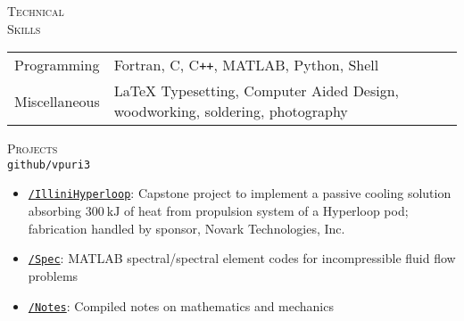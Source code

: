 \documentclass[10pt]{article}
\begin{document}
\vspace{-1.5em}
\begin{multicols}{2}
\textsc{\small Technical \\ Skills}
\columnbreak

\begin {table}[H]
\begin{tabular}{l l }
\hspace{-0.5em}Programming   & \hspace{-0.0em}Fortran, C, C\texttt{++}, MATLAB, Python, Shell\\
\hspace{-0.5em}Miscellaneous & \hspace{-0.0em}\LaTeX{} Typesetting, Computer Aided Design, woodworking, soldering, photography \\
\end{tabular}	
\end{table}

\vspace{-1.0em}
\end{multicols}
\vspace{-1.5em}
\begin{multicols}{2}
\textsc{\small Projects}\\ \texttt{github/vpuri3}
\columnbreak

\vspace{-2.0em}
\begin{itemize}[label=-]
    \setlength{\itemindent}{-1.5em}
    \setlength\itemsep{-0.5\itemsep}
    \item \href{https://github.com/vpuri3/IlliniHyperloop}{\texttt{/IlliniHyperloop}}: Capstone project to implement a passive cooling solution absorbing $\SI{300}{\kilo \joule}$ of heat from propulsion system of a Hyperloop pod; fabrication handled by sponsor, Novark Technologies, Inc.
    \item \href{https://github.com/vpuri3/Spec}{\texttt{/Spec}}: MATLAB spectral/spectral element codes for incompressible fluid flow problems
    \item \href{https://github.com/vpuri3/Notes}{\texttt{/Notes}}: Compiled notes on mathematics and mechanics
\end{itemize}
\vspace{-2.0em}

\end{multicols}
\vspace{-1.5em}
\vfill
\end{document}
